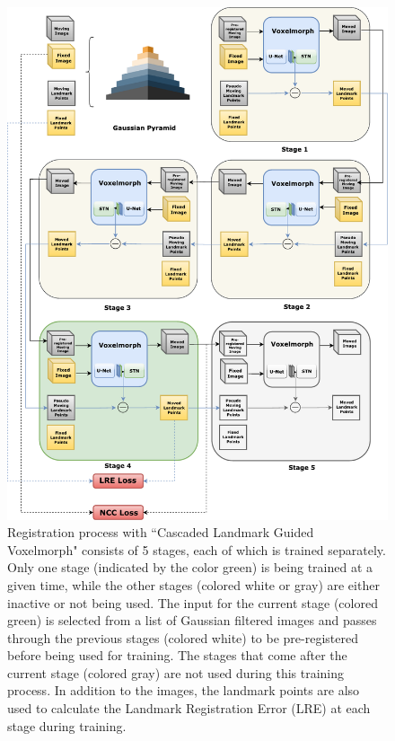 \documentclass{book}
\begin{document}
	\begin{figure}[p!]
		\centering
		\includegraphics[width=\columnwidth]{resources/chapter4/methods/Method4.pdf}
		\caption{Registration process with ``Cascaded Landmark Guided Voxelmorph" consists of 5 stages, each of which is trained separately. Only one stage (indicated by the color green) is being trained at a given time, while the other stages (colored white or gray) are either inactive or not being used. The input for the current stage (colored green) is selected from a list of Gaussian filtered images and passes through the previous stages (colored white) to be pre-registered before being used for training. The stages that come after the current stage (colored gray) are not used during this training process. In addition to the images, the landmark points are also used to calculate the Landmark Registration Error (LRE) at each stage during training.}
		\label{fig:block_method4}
	\end{figure}
	
\end{document}
